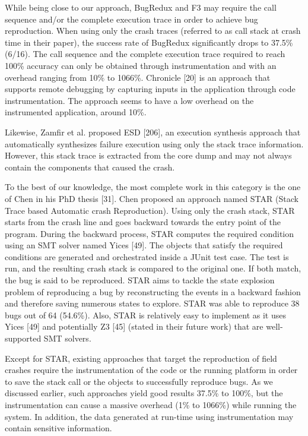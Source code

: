\documentclass[12pt]{report}
\begin{document}
While being close to our approach, BugRedux and F3 may require the call
sequence and/or the complete execution trace in order to achieve bug
reproduction. When using only the crash traces (referred to as call
stack at crash time in their paper), the success rate of BugRedux
significantly drops to 37.5\% (6/16). The call sequence and the complete
execution trace required to reach 100\% accuracy can only be obtained
through instrumentation and with an overhead ranging from 10\% to
1066\%. Chronicle {[}20{]} is an approach that supports remote debugging
by capturing inputs in the application through code instrumentation. The
approach seems to have a low overhead on the instrumented application,
around 10\%.

Likewise, Zamfir et al. proposed ESD {[}206{]}, an execution synthesis
approach that automatically synthesizes failure execution using only the
stack trace information. However, this stack trace is extracted from the
core dump and may not always contain the components that caused the
crash.

To the best of our knowledge, the most complete work in this category is
the one of Chen in his PhD thesis {[}31{]}. Chen proposed an approach
named STAR (Stack Trace based Automatic crash Reproduction). Using only
the crash stack, STAR starts from the crash line and goes backward
towards the entry point of the program. During the backward process,
STAR computes the required condition using an SMT solver named Yices
{[}49{]}. The objects that satisfy the required conditions are generated
and orchestrated inside a JUnit test case. The test is run, and the
resulting crash stack is compared to the original one. If both match,
the bug is said to be reproduced. STAR aims to tackle the state
explosion problem of reproducing a bug by reconstructing the events in a
backward fashion and therefore saving numerous states to explore. STAR
was able to reproduce 38 bugs out of 64 (54.6\%). Also, STAR is
relatively easy to implement as it uses Yices {[}49{]} and potentially
Z3 {[}45{]} (stated in their future work) that are well-supported SMT
solvers.

Except for STAR, existing approaches that target the reproduction of
field crashes require the instrumentation of the code or the running
platform in order to save the stack call or the objects to successfully
reproduce bugs. As we discussed earlier, such approaches yield good
results 37.5\% to 100\%, but the instrumentation can cause a massive
overhead (1\% to 1066\%) while running the system. In addition, the data
generated at run-time using instrumentation may contain sensitive
information.
\end{document}
